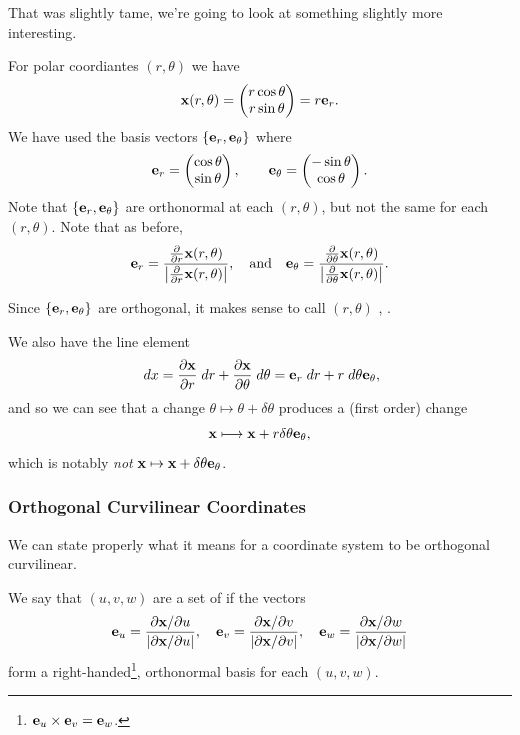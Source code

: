 \documentclass[a4paper]{scrartcl}
\begin{document}
That was slightly tame, we're going to look at something slightly more interesting.

\begin{example}
	For polar coordiantes $(r, \theta)$ we have
	$$
\mathbf{x}(r, \theta) = \begin{pmatrix}
	r \cos \theta \\
	r \sin \theta
\end{pmatrix} = r \mathbf{e}_r.
	$$
	We have used the basis vectors $\{\mathbf{e}_r, \mathbf{e}_\theta\}$ where
	$$
\mathbf{e}_r = \begin{pmatrix}
	\cos \theta \\ \sin \theta
\end{pmatrix}, \quad \quad \mathbf{e}_\theta = \begin{pmatrix}
	- \sin  \theta \\ \cos \theta
\end{pmatrix}.
$$
Note that $\{\mathbf{e}_r, \mathbf{e}_\theta\}$ are orthonormal at each $(r, \theta)$, but not the same for each $(r, \theta)$. Note that as before, 
$$\mathbf{e}_r = \frac{\frac{\partial}{\partial r} \mathbf{x}(r, \theta)}{\left|\frac{\partial}{\partial r} \mathbf{x}(r, \theta)\right|}, \quad \text{and} \quad 
\mathbf{e}_\theta = \frac{\frac{\partial}{\partial \theta} \mathbf{x}(r, \theta)}{\left|\frac{\partial}{\partial \theta} \mathbf{x}(r, \theta)\right|}.$$

Since $\{\mathbf{e}_r, \mathbf{e}_\theta\}$ are orthogonal, it makes sense to call $(r, \theta)$ , .

We also have the line element
$$
\; d x = \frac{\partial \mathbf{x}}{\partial r} \; d r + \frac{\partial \mathbf{x}}{\partial \theta} \; d \theta = \mathbf{e}_r \; d r + r \; d \theta \mathbf{e}_\theta,
$$
and so we can see that a change $\theta \mapsto \theta + \delta \theta$ produces a (first order) change
$$
\mathbf{x} \longmapsto \mathbf{x} + r \delta \theta \mathbf{e}_\theta,
$$
which is notably \emph{not} $\mathbf{x} \mapsto \mathbf{x} + \delta \theta \mathbf{e}_\theta$.
\end{example}

\subsubsection{Orthogonal Curvilinear Coordinates}

We can state properly what it means for a coordinate system to be orthogonal curvilinear.

\begin{definition}
	We say that $(u, v, w)$ are a set of  if the vectors
	$$
	\mathbf{e}_u = \frac{\partial \mathbf{x} / \partial u}{|\partial \mathbf{x} / \partial u|}, \quad \mathbf{e}_v = \frac{\partial \mathbf{x} / \partial v}{|\partial \mathbf{x} / \partial v|}, \quad \mathbf{e}_w = \frac{\partial \mathbf{x} / \partial w}{|\partial \mathbf{x} / \partial w|}
	$$
	form a right-handed\footnote{$\mathbf{e}_u \times \mathbf{e}_v = \mathbf{e}_w$.}, orthonormal basis for each $(u, v, w)$.
\end{definition}
\end{document}
